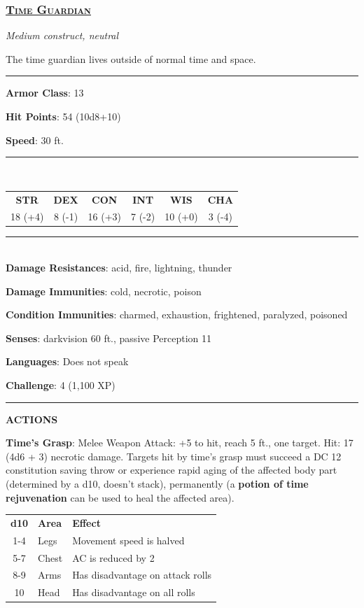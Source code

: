\subsubsection*{\underline{\textsc{\Large Time Guardian}}}
\noindent\emph{Medium construct, neutral}

The time guardian lives outside of normal time and space.

\noindent\rule{0.5\textwidth}{0.5pt}

\noindent\textbf{Armor Class}: 13

\noindent\textbf{Hit Points}: 54 (10d8+10)

\noindent\textbf{Speed}: 30 ft.

\noindent\rule{0.5\textwidth}{0.5pt} \\
\begin{table}[H]
	\begin{tabular}{cccccc}
		\textbf{STR} & \textbf{DEX} & \textbf{CON} & \textbf{INT} & \textbf{WIS} & \textbf{CHA} \\
		18 (+4) & 8 (-1) & 16 (+3) & 7 (-2) & 10 (+0) & 3 (-4) \\
	\end{tabular}
\end{table}
\noindent\rule{0.5\textwidth}{0.5pt} \\

\noindent\textbf{Damage Resistances}: acid, fire, lightning, thunder

\noindent\textbf{Damage Immunities}: cold, necrotic, poison

\noindent\textbf{Condition Immunities}: charmed, exhaustion, frightened, paralyzed, poisoned

\noindent\textbf{Senses}: darkvision 60 ft., passive Perception 11

\noindent\textbf{Languages}: Does not speak

\noindent\textbf{Challenge}: 4 (1,100 XP)

\noindent\rule{0.5\textwidth}{0.5pt}

\noindent\textbf{ACTIONS}

\noindent\textbf{Time's Grasp}: Melee Weapon Attack: +5 to hit, reach 5 ft., one target. Hit: 17 (4d6 + 3) necrotic damage. Targets hit by time's grasp must succeed a DC 12 constitution saving throw or experience rapid aging of the affected body part (determined by a d10, doesn't stack), permanently (a \textbf{potion of time rejuvenation} can be used to heal the affected area).

\begin{table}[H]
	\begin{tabular}{cll}
		\textbf{d10} & \textbf{Area} & \textbf{Effect} \\
		1-4 & Legs & Movement speed is halved \\
		5-7 & Chest & AC is reduced by 2 \\
		8-9 & Arms & Has disadvantage on attack rolls \\
		10 & Head & Has disadvantage on all rolls \\
	\end{tabular}
\end{table} 


